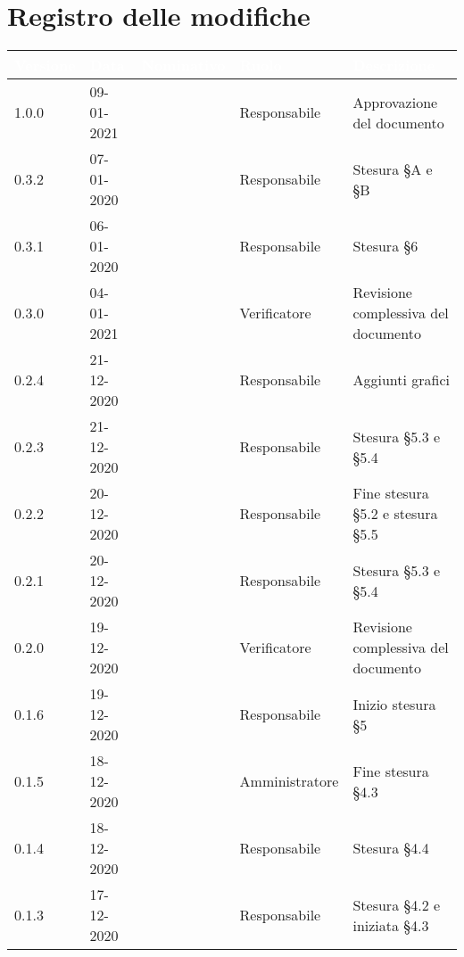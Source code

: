 \section*{Registro delle modifiche}
{
\renewcommand{\arraystretch}{1.5}
\centering
\begin{longtable}{C{1.5cm} C{2.5cm} C{3.2cm} C{2.7cm} C{5cm}}
\textcolor{white}{\textbf{Versione}}&
\textcolor{white}{\textbf{Data}}&
\textcolor{white}{\textbf{Nominativo}}&
\textcolor{white}{\textbf{Ruolo}}&
\textcolor{white}{\textbf{Descrizione}}\\	
\endhead

1.0.0 & 09-01-2021 & \SG{} & Responsabile & Approvazione del documento \\

0.3.2 & 07-01-2020 & \BM{} & Responsabile & Stesura \S A e \S B \\

0.3.1 & 06-01-2020 & \BM{} & Responsabile & Stesura \S 6\\

0.3.0 & 04-01-2021 & \SH{} & Verificatore & Revisione complessiva del documento \\

0.2.4 & 21-12-2020 & \SG{} & Responsabile & Aggiunti grafici \\

0.2.3 & 21-12-2020 & \BM{} & Responsabile & Stesura \S 5.3 e \S 5.4\\

0.2.2 & 20-12-2020 & \SG{} & Responsabile & Fine stesura \S 5.2 e stesura \S 5.5 \\

0.2.1 & 20-12-2020 & \BM{} & Responsabile & Stesura \S 5.3 e \S 5.4\\

0.2.0 & 19-12-2020 & \ZM{} & Verificatore & Revisione complessiva del documento \\

0.1.6 & 19-12-2020 & \SG{} & Responsabile & Inizio stesura \S 5 \\

0.1.5 & 18-12-2020 & \PA{} & Amministratore & Fine stesura \S 4.3\\

0.1.4 & 18-12-2020 & \SG{} & Responsabile & Stesura \S 4.4 \\

0.1.3 & 17-12-2020 & \BM{} & Responsabile & Stesura \S 4.2 e iniziata \S 4.3 \\


\end{longtable}}
